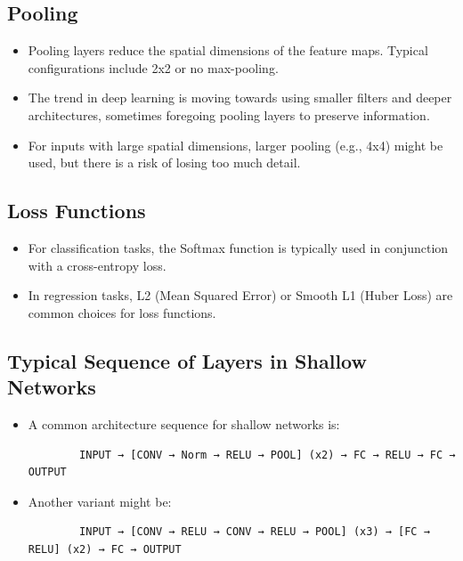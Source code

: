 \subsection*{Pooling}
\begin{itemize}
    \item Pooling layers reduce the spatial dimensions of the feature maps. Typical configurations include 2x2 or no max-pooling.
    \item The trend in deep learning is moving towards using smaller filters and deeper architectures, sometimes foregoing pooling layers to preserve information.
    \item For inputs with large spatial dimensions, larger pooling (e.g., 4x4) might be used, but there is a risk of losing too much detail.
\end{itemize}

\subsection*{Loss Functions}
\begin{itemize}
    \item For classification tasks, the Softmax function is typically used in conjunction with a cross-entropy loss.
    \item In regression tasks, L2 (Mean Squared Error) or Smooth L1 (Huber Loss) are common choices for loss functions.
\end{itemize}

\subsection*{Typical Sequence of Layers in Shallow Networks}
\begin{itemize}
    \item A common architecture sequence for shallow networks is:
    \begin{verbatim}
        INPUT → [CONV → Norm → RELU → POOL] (x2) → FC → RELU → FC → OUTPUT
    \end{verbatim}
    \item Another variant might be:
    \begin{verbatim}
        INPUT → [CONV → RELU → CONV → RELU → POOL] (x3) → [FC → RELU] (x2) → FC → OUTPUT
    \end{verbatim}
\end{itemize}

    
    
